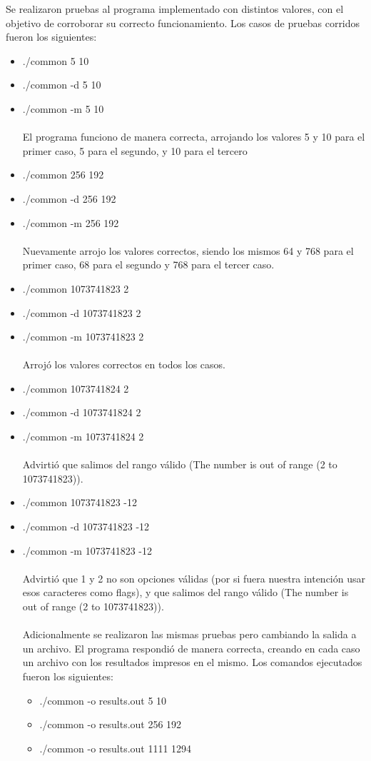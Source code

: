 \documentclass[a4paper,10pt]{article}
\begin{document}
    Se realizaron pruebas al programa implementado con distintos valores, con el objetivo de corroborar su correcto funcionamiento. Los casos de pruebas corridos fueron los siguientes:
    \begin{itemize}
        \item ./common 5 10
        \item ./common -d 5 10
        \item ./common -m 5 10\\
        \\El programa funciono de manera correcta, arrojando los valores 5 y 10 para el primer caso, 5 para el segundo, y 10 para el tercero
        \item ./common 256 192
        \item ./common -d 256 192
        \item ./common -m 256 192\\
        \\Nuevamente arrojo los valores correctos, siendo los mismos 64 y 768 para el primer caso, 68 para el segundo y 768 para el tercer caso.
        \item ./common 1073741823 2
        \item ./common -d 1073741823 2
        \item ./common -m 1073741823 2\\
        \\Arrojó los valores correctos en todos los casos.
        \item ./common 1073741824 2
        \item ./common -d 1073741824 2
        \item ./common -m 1073741824 2\\
        \\Advirtió que salimos del rango válido (The number is out of range (2 to 1073741823)).
        \item ./common 1073741823 -12
        \item ./common -d 1073741823 -12
        \item ./common -m 1073741823 -12\\
        \\Advirtió que 1 y 2 no son opciones válidas (por si fuera nuestra intención usar esos caracteres como flags), y que salimos del rango válido (The number is out of range (2 to 1073741823)).\\
        \\Adicionalmente se realizaron las mismas pruebas pero cambiando la salida a un archivo. El programa respondió de manera correcta, creando en cada caso un archivo con los resultados impresos en el mismo. Los comandos ejecutados fueron los siguientes:
        \begin{itemize}
            \item ./common -o results.out 5 10
            \item ./common -o results.out 256 192
            \item ./common -o results.out 1111 1294
        \end{itemize}
    \end{itemize}
    
\end{document}

